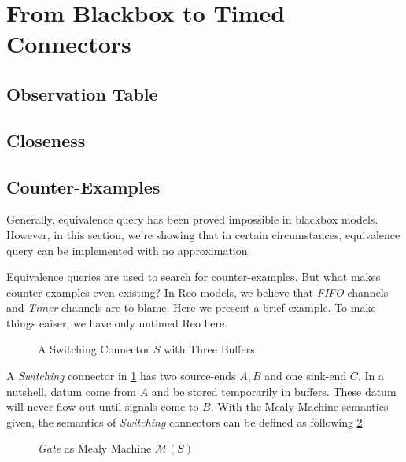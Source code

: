 \documentclass[conference, a4paper]{IEEEtran}
\begin{document}

\section{From Blackbox to Timed Connectors} 
\label{sec:activelearning}

\subsection{Observation Table}

\subsection{Closeness}

\subsection{Counter-Examples}
Generally, equivalence query has been proved impossible in blackbox
models\cite{DBLP:journals/iandc/Angluin87}. However, in this
section, we're showing that in certain circumstances, equivalence query can be implemented with
no approximation.

Equivalence queries are used to search for counter-examples. But what makes counter-examples even
existing? In Reo models, we believe that \emph{FIFO} channels and \emph{Timer} channels are to
blame. Here we present a brief example. To make things eaiser, we have only untimed Reo here.

\begin{figure}[h]
  \begin{center}
    
  \end{center}
  \caption{A Switching Connector $S$ with Three Buffers}
  \label{fig:buf3}
\end{figure}

A \emph{Switching} connector in \figurename \ref{fig:buf3} has two source-ends $A,B$ and one
sink-end $C$. In a nutshell, datum come from $A$ and be stored temporarily in buffers. These datum
will never flow out until signals come to $B$. With the Mealy-Machine semantics given, the semantics
of \emph{Switching} connectors can be defined as following \figurename \ref{fig:buf3semantics}.

\begin{figure}[h]
  \begin{center}
    
  \end{center}
  \caption{\emph{Gate} as Mealy Machine $\mathcal{M}(S)$}
  \label{fig:buf3semantics}
\end{figure}
\end{document}
